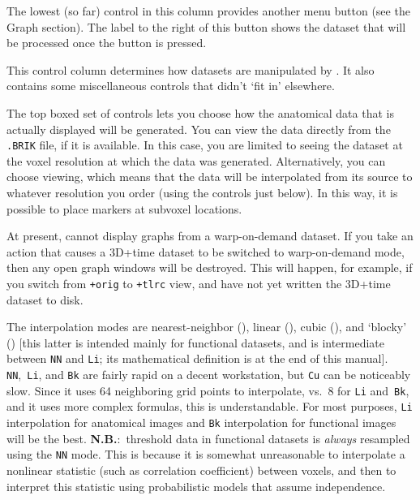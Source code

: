 The lowest (so far) control in this column provides another  menu
button (see the Graph section).  The label to the right of this button
shows the dataset that will be processed once the 
button is pressed.

This control column determines how datasets are manipulated by \afni.
It also contains some miscellaneous controls that didn't `fit in'
elsewhere.

The
top boxed set of controls
lets you choose how the anatomical data that is actually displayed will be
generated.  You can view the data directly from the {\tt .BRIK} file,
if it is available.  In this case, you are limited to seeing the dataset
at the voxel resolution at which the data was generated.  Alternatively,
you can choose  viewing, which means that the data
will be interpolated from its source to whatever resolution you order
(using the controls just below).  In this way, it is possible to place
markers at subvoxel locations.

At present, \afnit cannot display graphs from a warp-on-demand
dataset.  If you take an action that causes a 3D+time dataset
to be switched to warp-on-demand mode, then any open graph
windows will be destroyed.  This will happen, for example, if
you switch from {\tt +orig} to {\tt +tlrc} view, and have
not yet written the 3D+time dataset to disk.

The
interpolation modes are nearest-neighbor (), linear (),
cubic (), and `blocky' () [this latter is intended mainly for
functional datasets, and is intermediate between {\tt NN} and {\tt Li}; its
mathematical definition is at the end of this manual].
{\tt NN},~{\tt Li}, and {\tt Bk}
are fairly rapid on a decent workstation, but {\tt Cu} can be noticeably
slow.  Since it uses 64 neighboring grid points to interpolate, vs.\ 8
for {\tt Li} and~{\tt Bk},
and it uses more complex formulas, this is understandable.  For most
purposes, {\tt Li} interpolation for anatomical images and {\tt Bk} interpolation
for functional images will be the best.
{\bf N.B.}:~threshold data in functional datasets is {\it always\/} resampled
using the {\tt NN} mode.  This is because it is somewhat unreasonable to interpolate
a nonlinear statistic (such as correlation coefficient) between voxels,
and then to interpret this statistic using probabilistic models that
assume independence.

